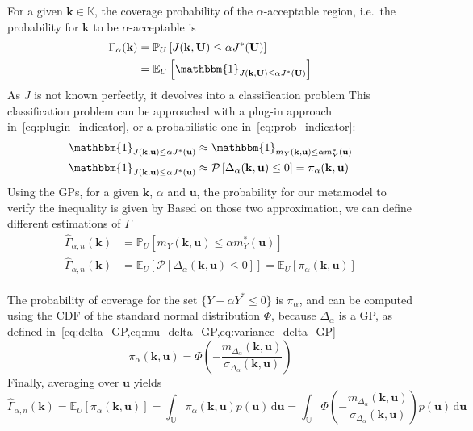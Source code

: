 \documentclass[a4paper,11pt]{article}
\newcommand{\Ex}{\mathbb{E}}
\newcommand{\Prob}{\mathbb{P}}
\newcommand{\ProbGP}{\mathcal{P}}
\newcommand{\Kspace}{\mathbb{K}}
\newcommand{\Uspace}{\mathbb{U}}
\newcommand{\kk}{\mathbf{k}}
\newcommand{\uu}{\mathbf{u}}
\newcommand{\UU}{\mathbf{U}}
\theoremstyle{defi}
\numberwithin{thmCounter}{section}
\begin{document}
For a given $\kk\in\Kspace$, the coverage probability of the $\alpha$-acceptable region, i.e.\ the probability for $\kk$ to be $\alpha$-acceptable is
\begin{align}
  \Gamma_{\alpha}(\kk) &= \Prob_{U}\left[J(\kk,\UU) \leq \alpha J^*(\UU)\right] \\
                              & =\Ex_{U}\left[\mathbbm{1}_{J(\kk,\UU) \leq \alpha J^*(\UU)}\right]
\end{align}
As $J$ is not known perfectly, it devolves into a classification problem
This classification problem can be approached with a plug-in approach in~\cref{eq:plugin_indicator}, or a probabilistic one in~\cref{eq:prob_indicator}:
\begin{align}
  \mathbbm{1}_{J(\kk,\uu) \leq \alpha J^*(\uu)} &\approx   \mathbbm{1}_{m_Y(\kk,\uu) \leq \alpha m_Y^*(\uu)} \label{eq:plugin_indicator} \\
  \mathbbm{1}_{J(\kk,\uu) \leq \alpha J^*(\uu)} &\approx   \ProbGP\left[ \Delta_{\alpha}(\kk,\uu) \leq 0 \right] = \pi_{\alpha}(\kk,\uu) \label{eq:prob_indicator}
\end{align}
Using the GPs, for a given $\kk$, $\alpha$ and $\uu$, the probability for our metamodel to verify the inequality is given by
Based on those two approximation, we can define different estimations of $\Gamma$
\begin{align}
  \hat{\Gamma}_{\alpha, n}(\kk) &= \Prob_U\left[m_Y(\kk,\uu) \leq \alpha m_Y^*(\uu) \right] \tag{plug-in} \\
  \hat{\Gamma}_{\alpha, n}(\kk) &= \Ex_U\left[ \ProbGP\left[ \Delta_{\alpha}(\kk,\uu) \leq 0\right]\right]  = \Ex_U\left[\pi_{\alpha}(\kk,\uu)\right]\tag{Probabilistic approx} \\
\end{align}

The probability of coverage for the set $\{Y - \alpha Y^*\leq 0\}$ is $\pi_{\alpha}$, and can be computed using the CDF of the standard normal distribution $\Phi$, because $\Delta_{\alpha}$ is a GP, as defined in~\cref{eq:delta_GP,eq:mu_delta_GP,eq:variance_delta_GP}
\begin{equation}
  \pi_{\alpha}(\kk,\uu) = \Phi\left(-\frac{m_{\Delta_\alpha}(\kk,\uu)}{\sigma_{\Delta_\alpha}(\kk,\uu)}\right)
\end{equation}
Finally, averaging over $\uu$ yields
\begin{equation}
  \hat{\Gamma}_{\alpha,n}(\kk) = \Ex_U\left[\pi_{\alpha}(\kk,\uu)\right]=\int_{\Uspace}\pi_{\alpha}(\kk,\uu)p(\uu) \,\mathrm{d}\uu = \int_{\Uspace}\Phi\left(-\frac{m_{\Delta_\alpha}(\kk,\uu)}{\sigma_{\Delta_\alpha}(\kk,\uu)}\right)p(\uu) \,\mathrm{d}\uu
\end{equation}
\end{document}

